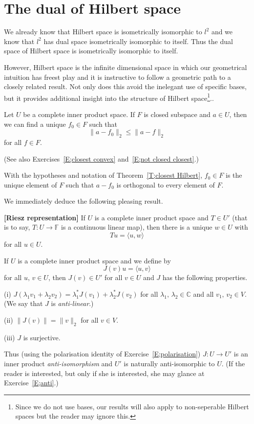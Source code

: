 \section{The dual of Hilbert space} We already know that
Hilbert space is isometrically isomorphic to $l^{2}$
and we know that $l^{2}$ has dual space isometrically isomorphic  
to itself. Thus the dual space of Hilbert space is isometrically
isomorphic to itself. 

However, Hilbert space is the 
infinite dimensional space in which our geometrical
intuition has freest play and it is instructive to follow a geometric
path to a closely related result. Not only 
does this avoid the inelegant use
of specific bases, but it provides additional insight into
the structure of Hilbert space\footnote{Since we do not
use bases, our results will also apply to non-seperable
Hilbert spaces but the reader may ignore this.}..
\begin{theorem}\label{T;closest Hilbert} 
Let $U$ be a complete inner product space.
If $F$ is closed subspace and $a\in U$, then we can find a unique
$f_{0}\in F$ such that
\[\|a-f_{0}\|_{2}\leq\|a-f\|_{2}\]
for all $f\in F$.
\end{theorem}
(See also Exercises~\ref{E;closest convex}
and~\ref{E;not closed closest}.)
\begin{lemma}\label{L;closest orthogonal} With the hypotheses and notation of 
Theorem~\ref{T;closest Hilbert}, $f_{0}\in F$ is the unique
element of $F$ such that $a-f_{0}$ is orthogonal to every element
of $F$.
\end{lemma}
We immediately deduce the following pleasing result. 
\begin{theorem}{\bf [Riesz representation]}\label{T;Riesz representation}
If
$U$ is a complete inner product space and
$T\in U'$ (that is to say, $T:U\rightarrow{\mathbb F}$
is a continuous linear map), then there is a unique
$w\in U$ with
\[Tu=\langle u,w\rangle\]
for all $u\in U$.
\end{theorem}
\begin{exercise} If
$U$ is a complete inner product space and we define
by
\[J(v)u=\langle u,v\rangle\]
for all $u,\,v\in U$, then $J(v)\in U'$ for all $v\in U$
and $J$ has the following properties.

(i) $J(\lambda_{1}v_{1}+\lambda_{2}v_{2})=
\lambda_{1}^{*}J(v_{1})+\lambda_{2}^{*}J(v_{2})$
for all $\lambda_{1},\,\lambda_{2}\in{\mathbb C}$
and all $v_{1},\,v_{2}\in V$. (We say that $J$
is \emph{anti-linear}.)

(ii) $\|J(v)\|=\|v\|_{2}$ for all $v\in V$.

(iii) $J$ is surjective.
\end{exercise}
Thus (using the polarisation identity of 
Exercise~\ref{E;polarisation}) $J:U\rightarrow U'$
is an inner product \emph{anti-isomorphism} 
and $U'$ is naturally anti-isomorphic to $U$.
(If the reader is interested, but only if she is interested,
she may glance at Exercise~\ref{E;anti}.)

